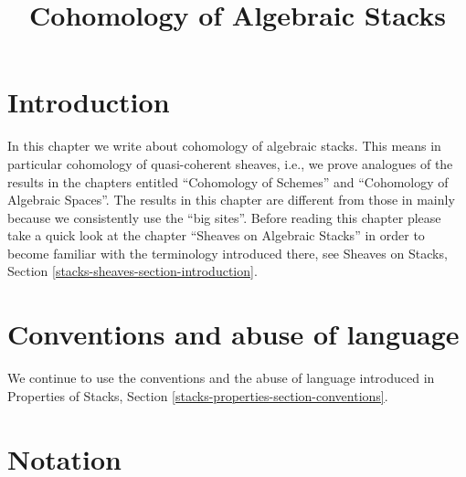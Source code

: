 

%


\title{Cohomology of Algebraic Stacks}

\maketitle

\label{section-phantom}

\tableofcontents




\section{Introduction}
\label{section-introduction}

\noindent
In this chapter we write about cohomology of algebraic stacks.
This means in particular cohomology of quasi-coherent sheaves, i.e.,
we prove analogues of the results in the chapters entitled
``Cohomology of Schemes'' and ``Cohomology of Algebraic Spaces''.
The results in this chapter are different
from those in \cite{LM-B} mainly because we consistently use the
``big sites''. Before reading this chapter please take a quick look at
the chapter ``Sheaves on Algebraic Stacks'' in order to become
familiar with the terminology introduced there, see
Sheaves on Stacks, Section \ref{stacks-sheaves-section-introduction}.



\section{Conventions and abuse of language}
\label{section-conventions}

\noindent
We continue to use the conventions and the abuse of language
introduced in
Properties of Stacks, Section \ref{stacks-properties-section-conventions}.











\section{Notation}
\label{section-notation}

